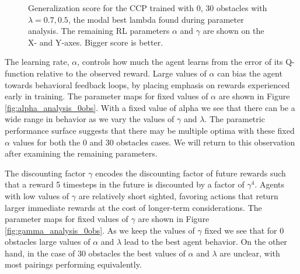 \documentclass[conference]{IEEEtran}
\begin{document}
\begin{figure}
\centering
\vspace{-5pt}
\caption{Generalization score for the CCP trained with 0, 30 obstacles with $\lambda = 0.7, 0.5$, the modal best lambda found during parameter analysis.
The remaining RL parameters $\alpha$ and $\gamma$ are shown on the X- and Y-axes. Bigger score is better. }
\label{fig:lambda_analysis_0obs}
\vspace{-5pt}
\end{figure}

The learning rate, $\alpha$, controls how much the agent learns from the
error of its Q-function relative to the observed reward. Large values of
$\alpha$ can bias the agent towards behavioral feedback loops, by placing
emphasis on rewards experienced early in training. The parameter maps for
fixed values of $\alpha$ are shown in Figure \ref{fig:alpha_analysis_0obs}.
With a fixed value of alpha we see that there can be a wide range in behavior
as we vary the values of $\gamma$ and $\lambda$. The parametric performance
surface suggests that there may be multiple optima with these fixed $\alpha$
values for both the 0 and 30 obstacles cases. We will return to this observation
after examining the remaining parameters.

The discounting factor $\gamma$ encodes the discounting factor of future
rewards such that a reward 5 timesteps in the future is discounted by
a factor of $\gamma^{4}$. Agents with low values of $\gamma$ are relatively
short sighted, favoring actions that return larger immediate rewards at the
cost of longer-term considerations. The parameter maps for fixed values of
$\gamma$ are shown in Figure \ref{fig:gamma_analysis_0obs}. As we keep the
values of $\gamma$ fixed we see that for 0 obstacles large values of $\alpha$
and $\lambda$ lead to the best agent behavior. On the other hand, in the case
of 30 obstacles the best values of $\alpha$ and $\lambda$ are unclear, with
most pairings performing equivalently.  
\end{document}

